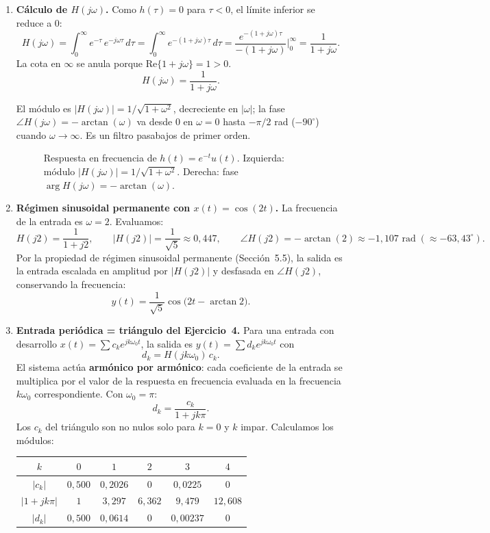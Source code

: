 \documentclass[10pt,a4paper]{article}
\begin{document}
	\begin{enumerate}[label=\textbf{\alph*)}]
		\item \textbf{Cálculo de $H(j\omega)$.} Como $h(\tau) = 0$ para $\tau < 0$, el límite inferior se reduce a $0$:
		\[
			H(j\omega) = \int_{0}^{\infty} e^{-\tau}\,e^{-j\omega\tau}\,d\tau
			= \int_{0}^{\infty} e^{-(1+j\omega)\tau}\,d\tau
			= \frac{e^{-(1+j\omega)\tau}}{-(1+j\omega)}\bigg|_{0}^{\infty}
			= \frac{1}{1 + j\omega}.
		\]
		La cota en $\infty$ se anula porque $\mathrm{Re}\{1 + j\omega\} = 1 > 0$.
		\[
			\boxed{H(j\omega) = \frac{1}{1 + j\omega}.}
		\]

		El módulo es $|H(j\omega)| = 1/\sqrt{1+\omega^2}$, decreciente en $|\omega|$; la fase $\angle H(j\omega) = -\arctan(\omega)$ va desde $0$ en $\omega = 0$ hasta $-\pi/2$ rad ($-90^\circ$) cuando $\omega \to \infty$. Es un filtro pasabajos de primer orden.

		\begin{figure}[H]
			\centering
			
			\caption{Respuesta en frecuencia de $h(t) = e^{-t}u(t)$. Izquierda: módulo $|H(j\omega)| = 1/\sqrt{1+\omega^2}$. Derecha: fase $\arg H(j\omega) = -\arctan(\omega)$.}
			\label{fig:ej10_H}
		\end{figure}

		\item \textbf{Régimen sinusoidal permanente con $x(t) = \cos(2t)$.} La frecuencia de la entrada es $\omega = 2$. Evaluamos:
		\[
			H(j2) = \frac{1}{1 + j2}, \qquad |H(j2)| = \frac{1}{\sqrt{5}} \approx 0{,}447,
			\qquad \angle H(j2) = -\arctan(2) \approx -1{,}107 \text{ rad}\; (\approx -63{,}43^\circ).
		\]
		Por la propiedad de régimen sinusoidal permanente (Sección~5.5), la salida es la entrada escalada en amplitud por $|H(j2)|$ y desfasada en $\angle H(j2)$, conservando la frecuencia:
		\[
			\boxed{y(t) = \frac{1}{\sqrt{5}}\cos\!\bigl(2t - \arctan 2\bigr).}
		\]

		\item \textbf{Entrada periódica = triángulo del Ejercicio~4.} Para una entrada con desarrollo $x(t) = \sum c_k e^{jk\omega_0 t}$, la salida es $y(t) = \sum d_k e^{jk\omega_0 t}$ con
		\[
			d_k = H(jk\omega_0)\,c_k.
		\]
		El sistema actúa \textbf{armónico por armónico}: cada coeficiente de la entrada se multiplica por el valor de la respuesta en frecuencia evaluada en la frecuencia $k\omega_0$ correspondiente. Con $\omega_0 = \pi$:
		\[
			d_k = \frac{c_k}{1 + jk\pi}.
		\]
		Los $c_k$ del triángulo son no nulos solo para $k = 0$ y $k$ impar. Calculamos los módulos:
		\begin{center}
			\begin{tabular}{c|ccccc}
				$k$ & $0$ & $1$ & $2$ & $3$ & $4$ \\ \hline
				$|c_k|$ & $0{,}500$ & $0{,}2026$ & $0$ & $0{,}0225$ & $0$ \\
				$|1 + jk\pi|$ & $1$ & $3{,}297$ & $6{,}362$ & $9{,}479$ & $12{,}608$ \\
				$|d_k|$ & $0{,}500$ & $0{,}0614$ & $0$ & $0{,}00237$ & $0$
			\end{tabular}
		\end{center}


\end{enumerate}
\end{document}
